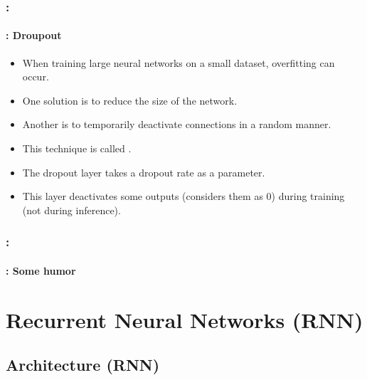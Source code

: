 \documentclass[xcolor=table]{beamer}
\begin{document}
\begin{frame}
	\frametitle{\insertshortsubtitle: \insertsection}
	\framesubtitle{\insertsubsection: Droupout}
	
	\begin{itemize}
		\item When training large neural networks on a small dataset, overfitting can occur.
		\item One solution is to reduce the size of the network.
		\item Another is to temporarily deactivate connections in a random manner.
		\item This technique is called .
		\item The dropout layer takes a dropout rate as a parameter.
		\item This layer deactivates some outputs (considers them as 0) during training (not during inference).
	\end{itemize}

\end{frame}


\begin{frame}
	\frametitle{\insertshortsubtitle: \insertsection}
	\framesubtitle{\insertsubsection: Some humor}


\end{frame}


\section{Recurrent Neural Networks (RNN)}

\begin{frame}
	\frametitle{\insertshortsubtitle}
	\framesubtitle{\insertsection}
	
	
\end{frame}


\subsection{Architecture (RNN)}
\end{document}
